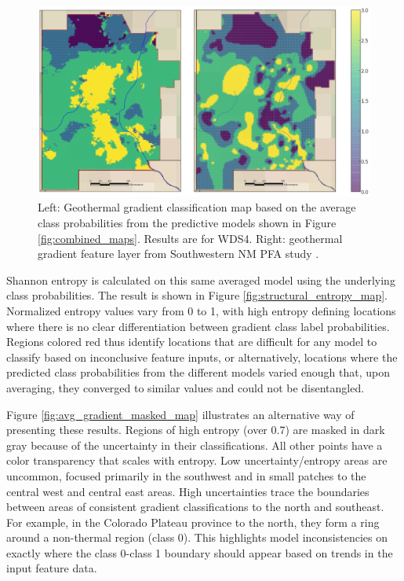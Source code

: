 \begin{figure}[!htp]
\centering
\includegraphics[width=\textwidth]{templates/images/Figure-Average_Gradient_Map_Joint.png}
\caption[Probability-averaged prediction map]{Left: Geothermal gradient classification map based on the average class probabilities from the predictive models shown in Figure \ref{fig:combined_maps}. Results are for WDS4. Right: geothermal gradient feature layer from Southwestern NM PFA study \protect\citep{bielicki_hydrogeolgic_2015}.}
\label{fig:avg_final_map}
\end{figure}

Shannon entropy is calculated on this same averaged model using the underlying class probabilities. The result is shown in Figure \ref{fig:structural_entropy_map}. Normalized entropy values vary from 0 to 1, with high entropy defining locations where there is no clear differentiation between gradient class label probabilities. Regions colored red thus identify locations that are difficult for any model to classify based on inconclusive feature inputs, or alternatively, locations where the predicted class probabilities from the different models varied enough that, upon averaging, they converged to similar values and could not be disentangled.

Figure \ref{fig:avg_gradient_masked_map} illustrates an alternative way of presenting these results. Regions of high entropy (over 0.7) are masked in dark gray because of the uncertainty in their classifications. All other points have a color transparency that scales with entropy. Low uncertainty/entropy areas are uncommon, focused primarily in the southwest and in small patches to the central west and central east areas. High uncertainties trace the boundaries between areas of consistent gradient classifications to the north and southeast. For example, in the Colorado Plateau province to the north, they form a ring around a non-thermal region (class 0). This highlights model inconsistencies on exactly where the class 0-class 1 boundary should appear based on trends in the input feature data.

